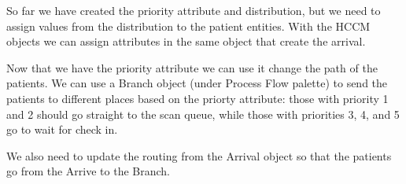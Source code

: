 \documentclass[
  10pt,
  a4paperpaper,
  DIV=11,
  numbers=noendperiod,
  oneside]{scrreprt}
\begin{document}
So far we have created the priority attribute and distribution, but we
need to assign values from the distribution to the patient entities.
With the HCCM objects we can assign attributes in the same object that
create the arrival.

\begin{table}[H]

\caption{\label{tbl-ass_pri}Assign Priority}


\end{table}%

Now that we have the priority attribute we can use it change the path of
the patients. We can use a Branch object (under Process Flow palette) to
send the patients to different places based on the priorty attribute:
those with priority 1 and 2 should go straight to the scan queue, while
those with priorities 3, 4, and 5 go to wait for check in.

\begin{table}[H]

\caption{\label{tbl-pri_branch}Priority Branch}


\end{table}%

We also need to update the routing from the Arrival object so that the
patients go from the Arrive to the Branch.

\begin{table}[H]

\caption{\label{tbl-upd_rout}Update Routing}


\end{table}%
\end{document}
